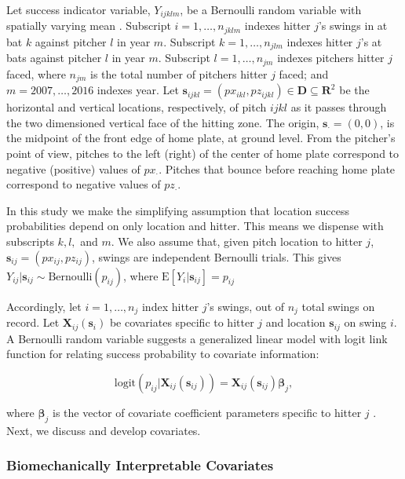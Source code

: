 Let success indicator variable, $Y_{ijklm}$, be a Bernoulli random variable with spatially varying mean \citep{Ross2002}. Subscript $i = 1, \dots, n_{jklm}$ indexes hitter $j$'s swings in at bat $k$ against pitcher $l$ in year $m$. Subscript $k = 1, \dots, n_{jlm}$ indexes hitter $j$'s at bats against pitcher $l$ in year $m$. Subscript $l = 1, \dots, n_{jm}$ indexes pitchers hitter $j$ faced, where $n_{jm}$ is the total number of pitchers hitter $j$ faced; and $m = 2007, \dots, 2016$ indexes year. Let $\pmb{s}_{ijkl} = (px_{ikl}, pz_{ijkl})\in \pmb{D} \subseteq \pmb{R}^{2}$ be the horizontal and vertical locations, respectively, of pitch $ijkl$ as it passes through the two dimensioned vertical face of the hitting zone. The origin, $\pmb{s}_{\cdot} = (0,0)$, is the midpoint of the front edge of home plate, at ground level. From the pitcher's point of view, pitches to the left (right) of the center of home plate correspond to negative (positive) values of $px_{\cdot}$. Pitches that bounce before reaching home plate correspond to negative values of $pz_{\cdot}$.  

In this study we make the simplifying assumption that location success probabilities depend on only location and hitter. This means we dispense with subscripts $k, l,$ and $m$. We also assume that, given pitch location to hitter $j$, $\pmb{s}_{ij} = (px_{ij}, pz_{ij})$,  swings are independent Bernoulli trials. This gives $Y_{ij}|\pmb{s}_{ij} \sim \text{Bernoulli}(p_{ij})$, where $\text{E}[Y_{i}|\pmb{s}_{ij}] = p_{ij}$

Accordingly, let $i = 1, \dots, n_{j}$ index hitter $j$'s swings, out of $n_{j}$ total swings on record. Let $\pmb{X}_{ij}(\pmb{s}_{i})$ be covariates specific to hitter $j$ and location $\pmb{s}_{ij}$ on swing $i$. A Bernoulli random variable suggests a generalized linear model with logit link function for relating success probability to covariate information:

\begin{equation}
\text{logit}(p_{ij}|\pmb{X}_{ij}(\pmb{s}_{ij})) = \pmb{X}_{ij}(\pmb{s}_{ij}) \pmb{\beta}_{j},
\end{equation}

where $\pmb{\beta}_{j}$ is the vector of covariate coefficient parameters specific to hitter $j$ \citep{Myers2012}. Next, we discuss and develop covariates.

\subsubsection{Biomechanically Interpretable Covariates} %

